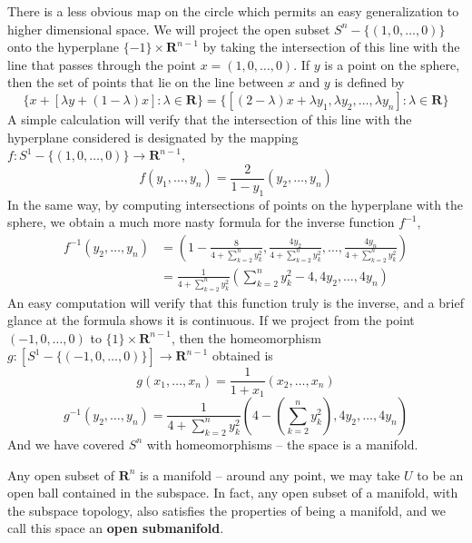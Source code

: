 \begin{example}
    There is a less obvious map on the circle which permits an easy generalization to higher dimensional space. We will project the open subset $S^n - \{(1,0,\dots,0)\}$ onto the hyperplane $\{-1\} \times \mathbf{R}^{n-1}$ by taking the intersection of this line with the line that passes through the point $x = (1,0, \dots, 0)$. If $y$ is a point on the sphere, then the set of points that lie on the line between $x$ and $y$ is defined by
    \[ \{ x + [\lambda y + (1 - \lambda) x] : \lambda \in \mathbf{R} \} = \{ [(2 - \lambda)x + \lambda y_1, \lambda y_2, \dots, \lambda y_n] : \lambda \in \mathbf{R} \} \]
    A simple calculation will verify that the intersection of this line with the hyperplane considered is designated by the mapping $f: S^1 - \{ (1,0,\dots,0) \} \to \mathbf{R}^{n-1}$,
    \[ f(y_1, \dots, y_n) = \frac{2}{1 - y_1}(y_2, \dots, y_n) \]
    In the same way, by computing intersections of points on the hyperplane with the sphere, we obtain a much more nasty formula for the inverse function $f^{-1}$,
    \begin{align*}
        f^{-1}(y_2, \dots, y_n) &= \left(1 - \frac{8}{4 + \sum_{k = 2}^n y_k^2}, \frac{4y_2}{4 + \sum_{k = 2}^n y_k^2}, \dots, \frac{4y_n}{4 + \sum_{k = 2}^n y_k^2} \right)\\
        &= \frac{1}{4 + \sum_{k = 2}^n y_k^2} \left( \sum_{k = 2}^n y_k^2 - 4, 4y_2, \dots, 4y_n \right)
    \end{align*}
    An easy computation will verify that this function truly is the inverse, and a brief glance at the formula shows it is continuous. If we project from the point $(-1,0,\dots,0)$ to $\{ 1 \} \times \mathbf{R}^{n-1}$, then the homeomorphism $g:[S^1 - \{ (-1, 0, \dots, 0) \}] \to \mathbf{R}^{n-1}$ obtained is
    \[ g(x_1, \dots, x_n) = \frac{1}{1 + x_1}(x_2, \dots, x_n) \]
    \[ g^{-1}(y_2, \dots, y_n) = \frac{1}{4 + \sum_{k = 2}^n y_k^2} \left( 4 - \left(\sum_{k = 2}^n y_k^2 \right), 4y_2, \dots, 4y_n \right) \]
    And we have covered $S^n$ with homeomorphisms -- the space is a manifold.
\end{example}

Any open subset of $\mathbf{R}^n$ is a manifold -- around any point, we may take $U$ to be an open ball contained in the subspace. In fact, any open subset of a manifold, with the subspace topology, also satisfies the properties of being a manifold, and we call this space an {\bf open submanifold}.

